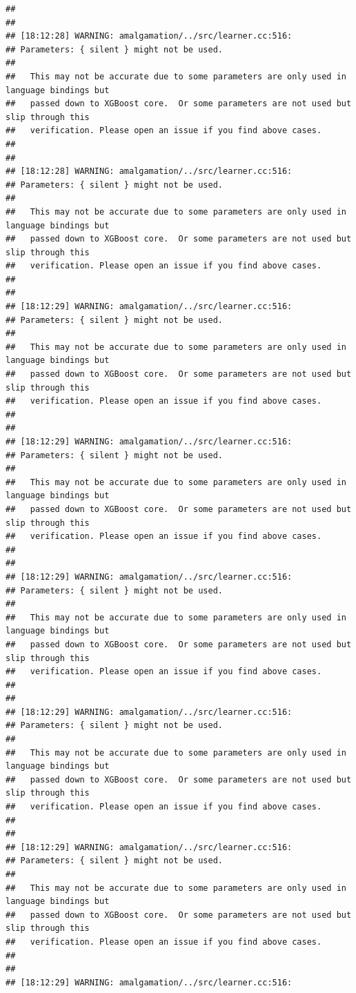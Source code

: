 \documentclass[AMS,STIX2COL]{WileyNJD-v2}\usepackage[]{graphicx}\usepackage[]{color}
\makeatletter
\newenvironment{kframe}{%
 \def\at@end@of@kframe{}%
 \ifinner\ifhmode%
  \def\at@end@of@kframe{\end{minipage}}%
  \begin{minipage}{\columnwidth}%
 \fi\fi%
 \def\FrameCommand##1{\hskip\@totalleftmargin \hskip-\fboxsep
 \colorbox{shadecolor}{##1}\hskip-\fboxsep
     \hskip-\linewidth \hskip-\@totalleftmargin \hskip\columnwidth}%
 \MakeFramed {\advance\hsize-\width
   \@totalleftmargin\z@ \linewidth\hsize
   \@setminipage}}%
 {\par\unskip\endMakeFramed%
 \at@end@of@kframe}
\newenvironment{knitrout}{}{} %
\makeatother
\begin{document}
\begin{knitrout}
\begin{kframe}
\begin{verbatim}
## 
## 
## [18:12:28] WARNING: amalgamation/../src/learner.cc:516: 
## Parameters: { silent } might not be used.
## 
##   This may not be accurate due to some parameters are only used in language bindings but
##   passed down to XGBoost core.  Or some parameters are not used but slip through this
##   verification. Please open an issue if you find above cases.
## 
## 
## [18:12:28] WARNING: amalgamation/../src/learner.cc:516: 
## Parameters: { silent } might not be used.
## 
##   This may not be accurate due to some parameters are only used in language bindings but
##   passed down to XGBoost core.  Or some parameters are not used but slip through this
##   verification. Please open an issue if you find above cases.
## 
## 
## [18:12:29] WARNING: amalgamation/../src/learner.cc:516: 
## Parameters: { silent } might not be used.
## 
##   This may not be accurate due to some parameters are only used in language bindings but
##   passed down to XGBoost core.  Or some parameters are not used but slip through this
##   verification. Please open an issue if you find above cases.
## 
## 
## [18:12:29] WARNING: amalgamation/../src/learner.cc:516: 
## Parameters: { silent } might not be used.
## 
##   This may not be accurate due to some parameters are only used in language bindings but
##   passed down to XGBoost core.  Or some parameters are not used but slip through this
##   verification. Please open an issue if you find above cases.
## 
## 
## [18:12:29] WARNING: amalgamation/../src/learner.cc:516: 
## Parameters: { silent } might not be used.
## 
##   This may not be accurate due to some parameters are only used in language bindings but
##   passed down to XGBoost core.  Or some parameters are not used but slip through this
##   verification. Please open an issue if you find above cases.
## 
## 
## [18:12:29] WARNING: amalgamation/../src/learner.cc:516: 
## Parameters: { silent } might not be used.
## 
##   This may not be accurate due to some parameters are only used in language bindings but
##   passed down to XGBoost core.  Or some parameters are not used but slip through this
##   verification. Please open an issue if you find above cases.
## 
## 
## [18:12:29] WARNING: amalgamation/../src/learner.cc:516: 
## Parameters: { silent } might not be used.
## 
##   This may not be accurate due to some parameters are only used in language bindings but
##   passed down to XGBoost core.  Or some parameters are not used but slip through this
##   verification. Please open an issue if you find above cases.
## 
## 
## [18:12:29] WARNING: amalgamation/../src/learner.cc:516: 

\end{verbatim}
\end{kframe}
\end{knitrout}
\end{document}
